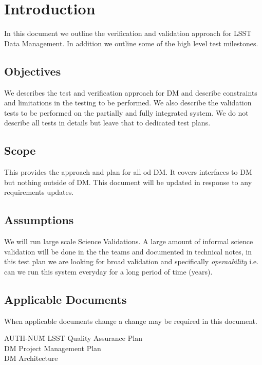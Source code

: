 
\section{Introduction \label{sect:intro}}
In this document  we outline the verification and validation approach for LSST Data Management. In addition we outline some of the high level test milestones. 


\subsection{Objectives \label{sect:objectives}}

We describes the test and verification approach for DM and describe  constraints and limitations in the testing to be performed. 
We also describe the validation tests to be performed on the partially and fully integrated system. 
We do not describe all tests in details but leave that to dedicated test plans.


\subsection{Scope \label{sect:scope}}

This provides the approach and plan for all od DM. It covers interfaces to DM but nothing outside of DM. 
This document will be updated in response to any  requirements updates.

\subsection{Assumptions}  
 We will run large scale Science Validations. A large amount of informal science validation will be done in the the teams and documented in technical notes, in this test plan we are looking for broad validation and specifically {\em operaability} i.e. can we run this system everyday for a long period of time (years).

\subsection{Applicable Documents \label{sect:ad}}
When applicable documents change a change may be required in this document.
\begin{tabbing}
AUTH-NUM\= \kill 
{}\>	LSST Quality  Assurance Plan \\
 \>	DM Project Management Plan   \\
\>	DM Architecture\\
\end{tabbing}


